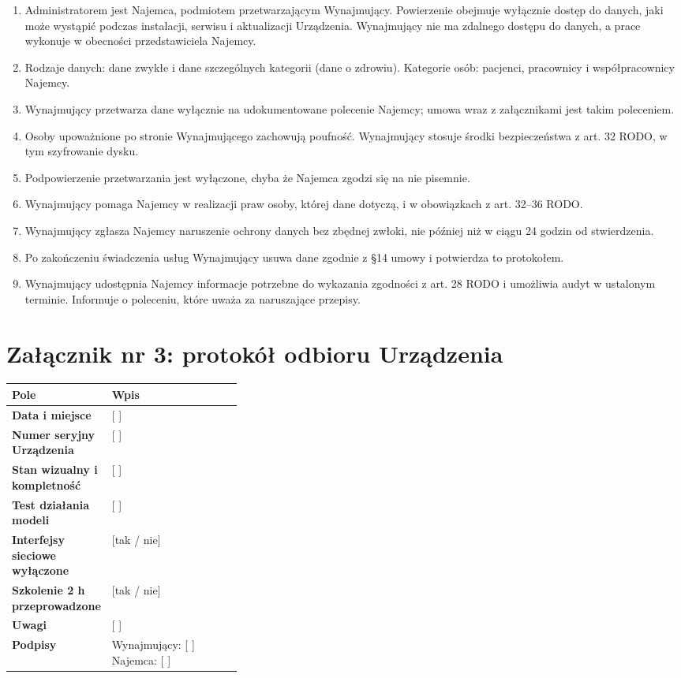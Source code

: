 \documentclass[11pt,a4paper]{article}
\begin{document}
\begin{enumerate}
\item Administratorem jest Najemca, podmiotem przetwarzającym Wynajmujący. Powierzenie obejmuje wyłącznie dostęp do danych, jaki może wystąpić podczas instalacji, serwisu i aktualizacji Urządzenia. Wynajmujący nie ma zdalnego dostępu do danych, a prace wykonuje w obecności przedstawiciela Najemcy.
\item Rodzaje danych: dane zwykłe i dane szczególnych kategorii (dane o zdrowiu). Kategorie osób: pacjenci, pracownicy i współpracownicy Najemcy.
\item Wynajmujący przetwarza dane wyłącznie na udokumentowane polecenie Najemcy; umowa wraz z załącznikami jest takim poleceniem.
\item Osoby upoważnione po stronie Wynajmującego zachowują poufność. Wynajmujący stosuje środki bezpieczeństwa z art. 32 RODO, w tym szyfrowanie dysku.
\item Podpowierzenie przetwarzania jest wyłączone, chyba że Najemca zgodzi się na nie pisemnie.
\item Wynajmujący pomaga Najemcy w realizacji praw osoby, której dane dotyczą, i w obowiązkach z art. 32–36 RODO.
\item Wynajmujący zgłasza Najemcy naruszenie ochrony danych bez zbędnej zwłoki, nie później niż w ciągu 24 godzin od stwierdzenia.
\item Po zakończeniu świadczenia usług Wynajmujący usuwa dane zgodnie z §14 umowy i potwierdza to protokołem.
\item Wynajmujący udostępnia Najemcy informacje potrzebne do wykazania zgodności z art. 28 RODO i umożliwia audyt w ustalonym terminie. Informuje o poleceniu, które uważa za naruszające przepisy.
\end{enumerate}

\section*{Załącznik nr 3: protokół odbioru Urządzenia}

\begin{tabularx}{\linewidth}{@{}>{\bfseries}p{0.34\linewidth}X@{}}
\toprule
Pole & Wpis \\
\midrule
Data i miejsce & [ ] \\
Numer seryjny Urządzenia & [ ] \\
Stan wizualny i kompletność & [ ] \\
Test działania modeli & [ ] \\
Interfejsy sieciowe wyłączone & [tak / nie] \\
Szkolenie 2 h przeprowadzone & [tak / nie] \\
Uwagi & [ ] \\
Podpisy & Wynajmujący: [ ] \quad Najemca: [ ] \\
\bottomrule
\end{tabularx}
\end{document}
